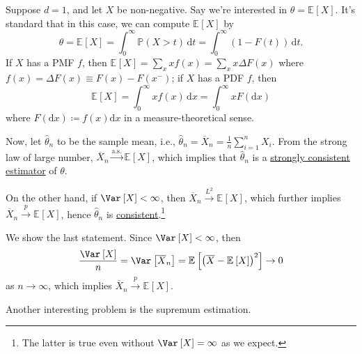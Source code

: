\begin{eg}
	Suppose \(d = 1\), and let \(X\) be non-negative. Say we're interested in \(\theta = \mathbb{E}_{}\left[X \right] \). It's standard that in this case, we can compute \(\mathbb{E}_{}\left[X \right] \) by
	\[
		\theta
		= \mathbb{E}_{}\left[X \right]
		= \int_{0}^{\infty} \mathbb{P} (X > t) \,\mathrm{d}t
		= \int_{0}^{\infty} (1 - F(t)) \,\mathrm{d}t.
	\]
	If \(X\) has a PMF \(f\), then \(\mathbb{E}_{}\left[X \right] = \sum_{x} x f(x) = \sum_{x} x \Delta F(x)\) where \(f(x) = \Delta F(x) \equiv F(x) - F(x^-)\); if \(X\) has a PDF \(f\), then
	\[
		\mathbb{E}_{}\left[X \right]
		= \int_{0}^{\infty} x f(x) \,\mathrm{d}x
		= \int_{0}^{\infty} x F(\mathrm{d}x)
	\]
	where \(F(\mathrm{d} x) \coloneqq f(x) \mathrm{d} x\) in a measure-theoretical sense.

	Now, let \(\hat{\theta} _n\) to be the sample mean, i.e., \(\hat{\theta} _n = \overline{X} _n = \frac{1}{n} \sum_{i=1}^{n} X_i\). From the strong law of large number, \(\overline{X} _n \overset{\text{a.s.} }{\to } \mathbb{E}_{}\left[ X \right] \), which implies that \(\hat{\theta} _n\) is a \hyperref[def:strongly-consistent]{strongly consistent estimator} of \(\theta \).

	On the other hand, if \(\Var_{}\left[X \right] < \infty \), then \(\overline{X} _n \overset{L^2}{\to } \mathbb{E}_{}\left[X \right] \), which further implies \(\overline{X} _n \overset{p}{\to } \mathbb{E}_{}\left[X \right] \), hence \(\hat{\theta} _n\) is \hyperref[def:consistent]{consistent}.\footnote{The latter is true even without \(\Var_{}\left[X \right] = \infty \) as we expect.}
\end{eg}
\begin{explanation}
	We show the last statement. Since \(\Var_{}\left[X \right] < \infty \), then
	\[
		\frac{\Var_{}\left[X \right] }{n}
		= \Var_{}\left[\overline{X} _n \right]
		= \mathbb{E}_{}\left[ \left( \overline{X} - \mathbb{E}_{}\left[X \right]  \right) ^2 \right]
		\to 0
	\]
	as \(n \to \infty \), which implies \(\overline{X} _n \overset{p}{\to } \mathbb{E}_{}\left[X \right] \).
\end{explanation}

Another interesting problem is the supremum estimation.

